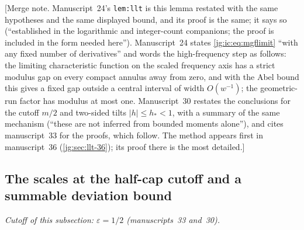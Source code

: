 \documentclass[11pt,a4paper]{article}
\theoremstyle{definition}\newaliascnt{definition}{theorem}
\theoremstyle{remark}\newaliascnt{remark}{theorem}
\begin{document}
[Merge note. Manuscript~24's \texttt{lem:llt} is this lemma restated with the
same hypotheses and the same displayed bound, and its proof is the same; it
says so (``established in the logarithmic and integer-count companions; the
proof is included in the form needed here''). Manuscript~24 states
\eqref{jg:ic:eq:mgflimit} ``with any fixed number of derivatives'' and words
the high-frequency step as follows: the limiting characteristic function on the
scaled frequency axis has a strict modulus gap on every compact annulus away
from zero, and with the Abel bound this gives a fixed gap outside a central
interval of width $O(w^{-1})$; the geometric-run factor has modulus at most one.
Manuscript~30 restates the conclusions for the cutoff $m/2$ and two-sided tilts
$|h|\le h_*<1$, with a summary of the same mechanism (``these are not inferred
from bounded moments alone''), and cites manuscript~33 for the proofs, which
follow. The method appears first in manuscript~36 (\cref{jg:sec:llt-36}); its
proof there is the most detailed.]

\subsection{The scales at the half-cap cutoff and a summable deviation bound}
\label{jg:sec:llt-33}
\emph{Cutoff of this subsection: $\varepsilon=1/2$ (manuscripts~33 and~30).}
\end{document}
